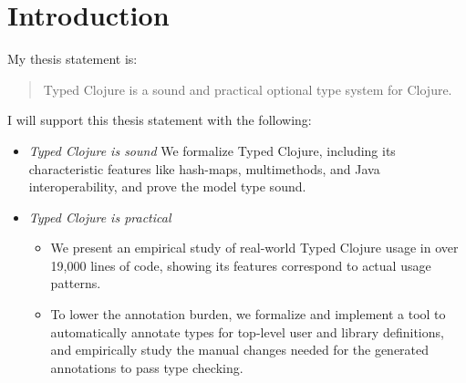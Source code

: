 \chapter{Introduction}

My thesis statement is:

\begin{quote}
Typed Clojure is a sound and practical optional type system for Clojure.
\end{quote}

I will support this thesis statement with the following:

\begin{itemize}
  \item \emph{Typed Clojure is sound} We formalize Typed Clojure, including
    its characteristic features like hash-maps, multimethods, and Java interoperability,
    and prove the model type sound.
  \item \emph{Typed Clojure is practical} 
    \begin{itemize}
      \item We present an empirical study of real-world Typed Clojure usage
        in over 19,000 lines of code, showing its features correspond to actual usage patterns.
       \item %
         To lower the annotation burden,
          we formalize and implement a tool to automatically annotate types for top-level
          user and library definitions, and empirically study the manual changes needed for the generated annotations
          to pass type checking.
    \end{itemize}
\end{itemize}

